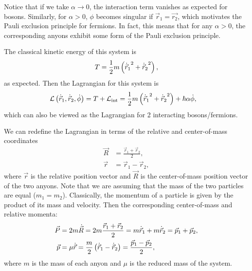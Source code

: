 Notice that if we take $\alpha\to 0$, the interaction term vanishes as expected for bosons. Similarly, for $\alpha>0$, $\phi$ becomes singular if $\vec{r}_1 = \vec{r_2}$, which motivates the Pauli exclusion principle for fermions. In fact, this means that for any $\alpha>0$, the corresponding anyons exhibit some form of the Pauli exclusion principle.

The classical kinetic energy of this system is
\begin{equation}
    T = \frac{1}{2}m\left( {\dot{\vec{r}}_1}^2 + {\dot{\vec{r}}_2}^2 \right),
\end{equation}
as expected. Then the Lagrangian for this system is
\begin{align}
    \mathcal{L}\left( \dot{\vec{r}}_1,\dot{\vec{r}}_2, \dot{\phi} \right) &= T + \mathcal{L}_{\text{int}} = \frac{1}{2}m\left( {\dot{\vec{r}}_1}^2 + {\dot{\vec{r}}_2}^2 \right) + \hbar\alpha\dot{\phi},
\end{align}
which can also be viewed as the Lagrangian for 2 interacting bosons/fermions.

We can redefine the Lagrangian in terms of the relative and center-of-mass coordinates
\begin{align}
    \vec{R} &= \frac{\vec{r}_1+\vec{r}_2}{2}, \\
    \vec{r} &= \vec{r}_1-\vec{r}_2,
\end{align}
where $\vec{r}$ is the relative position vector and $\vec{R}$ is the center-of-mass position vector of the two anyons. Note that we are assuming that the mass of the two particles are equal ($m_1=m_2$). Classically, the momentum of a particle is given by the product of its mass and velocity. Then the corresponding center-of-mass and relative momenta:
\begin{align}
    \vec{P} &= 2m\dot{\vec{R}} = 2m \frac{\vec{r}_1+\vec{r}_2}{2} = m\dot{\vec{r}}_1 + m\dot{\vec{r}}_2 = \vec{p}_1 + \vec{p}_2, \\
    \vec{p} &= \mu\dot{\vec{r}} = \frac{m}{2}\left( \dot{\vec{r}}_1-\dot{\vec{r}}_2 \right) = \frac{\vec{p}_1 - \vec{p}_2}{2},
\end{align}
where $m$ is the mass of each anyon and $\mu$ is the reduced mass of the system.

